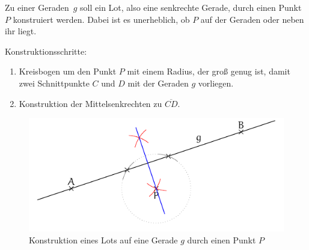 \begin{regel}
Zu einer Geraden~\(g\) soll ein Lot, also eine senkrechte Gerade, durch einen Punkt~\(P\) konstruiert werden. Dabei ist es unerheblich, ob \(P\) auf der Geraden oder neben ihr liegt.

Konstruktionsschritte:
\begin{enumerate}
 \item Kreisbogen um den Punkt \(P\) mit einem Radius, der groß genug ist, damit zwei Schnittpunkte \(C\) und \(D\) mit der Geraden \(g\) vorliegen.
 \item Konstruktion der Mittelsenkrechten zu \(\overline{CD}\).
\end{enumerate}

\begin{figure}[t]
 \centering
 \includegraphics[width=\textwidth]{./lot_konstr.pdf}
 \caption{Konstruktion eines Lots auf eine Gerade $g$ durch einen Punkt $P$}
 \label{fig:lot_konstr}
\end{figure}

\end{regel}



